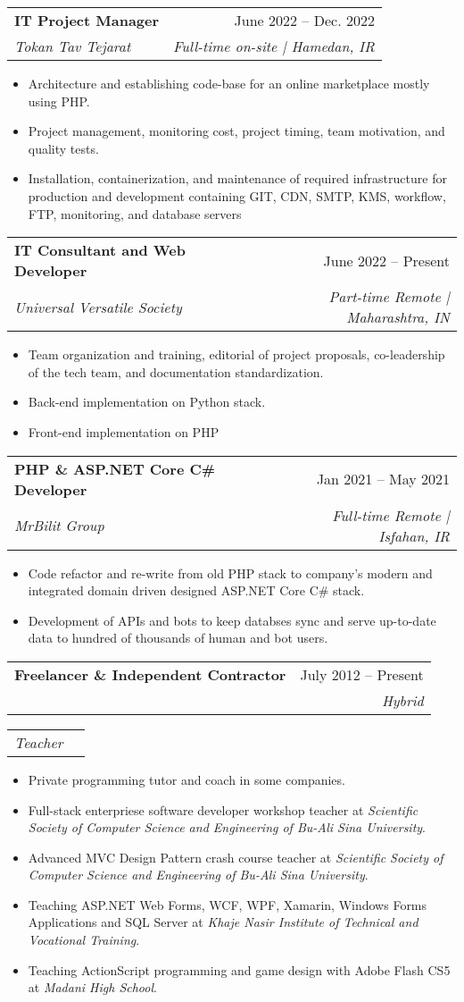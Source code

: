 \documentclass[letterpaper,11pt]{article}
\makeatletter
\newcommand{\resumeItem}[1]{
  \item\small{
    {#1 \vspace{-2pt}}
  }
}
\newcommand{\resumeSubheading}[4]{
  \vspace{-2pt}\item
    \begin{tabular*}{0.97\textwidth}[t]{l@{\extracolsep{\fill}}r}
      \textbf{#1} & #2 \\
      \textit{\small#3} & \textit{\small #4} \\
    \end{tabular*}\vspace{-7pt}
}
\newcommand{\resumeSubSubheading}[2]{
    \item
    \begin{tabular*}{0.97\textwidth}{l@{\extracolsep{\fill}}r}
      \textit{\small#1} & \textit{\small #2} \\
    \end{tabular*}\vspace{-7pt}
}
\newcommand{\resumeItemListStart}{\begin{itemize}}
\newcommand{\resumeItemListEnd}{\end{itemize}\vspace{-5pt}}
\makeatother
\begin{document}
    \resumeSubheading
      {IT Project Manager}{June 2022 -- Dec. 2022}
      {Tokan Tav Tejarat}{Full-time on-site | Hamedan, IR}

      \resumeItemListStart
        \resumeItem{Architecture and establishing code-base for an online marketplace mostly using PHP.}
        \resumeItem{Project management, monitoring cost, project
timing, team motivation, and quality tests.}
        \resumeItem{Installation, containerization, and maintenance of required
infrastructure for production and development containing GIT, CDN, SMTP, KMS, workflow, FTP, monitoring, and database servers}
      \resumeItemListEnd

    \resumeSubheading
      {IT Consultant and Web Developer}{June 2022 -- Present}
      {Universal Versatile Society}{Part-time Remote | Maharashtra, IN}

      \resumeItemListStart
        \resumeItem{Team organization and training, editorial of project proposals, co-leadership of the tech team, and documentation standardization.}
        \resumeItem{Back-end implementation on Python stack.}
        \resumeItem{Front-end implementation on PHP}
      \resumeItemListEnd

      \resumeSubheading
      {PHP \& ASP.NET Core C\# Developer}{Jan 2021 -- May 2021}
      {MrBilit Group}{Full-time Remote | Isfahan, IR}

      \resumeItemListStart
        \resumeItem{Code refactor and re-write from old PHP stack to company's modern and integrated domain driven designed ASP.NET Core C\# stack.}
        \resumeItem{Development of APIs and bots to keep databses sync and serve up-to-date data to hundred of thousands of human and bot users.}
      \resumeItemListEnd

    \resumeSubheading
        {Freelancer \& Independent Contractor}{July 2012 -- Present}
        {}{Hybrid}
        
        \resumeSubSubheading
          {Teacher}{}
          \resumeItemListStart
            \resumeItem{Private programming tutor and coach in some companies.}
            \resumeItem{Full-stack enterpriese software developer workshop teacher at \emph{Scientific Society of Computer Science and Engineering of Bu-Ali Sina University}. }
            \resumeItem{Advanced MVC Design Pattern crash course teacher at \emph{Scientific Society of Computer Science and Engineering of Bu-Ali Sina University}. }
            \resumeItem{Teaching ASP.NET Web Forms, WCF, WPF, Xamarin, Windows Forms Applications and SQL Server at \emph{Khaje Nasir Institute of Technical and Vocational Training}. }
            \resumeItem{Teaching ActionScript programming and game design with Adobe Flash CS5 at \emph{Madani High School}. }
          \resumeItemListEnd
\end{document}
